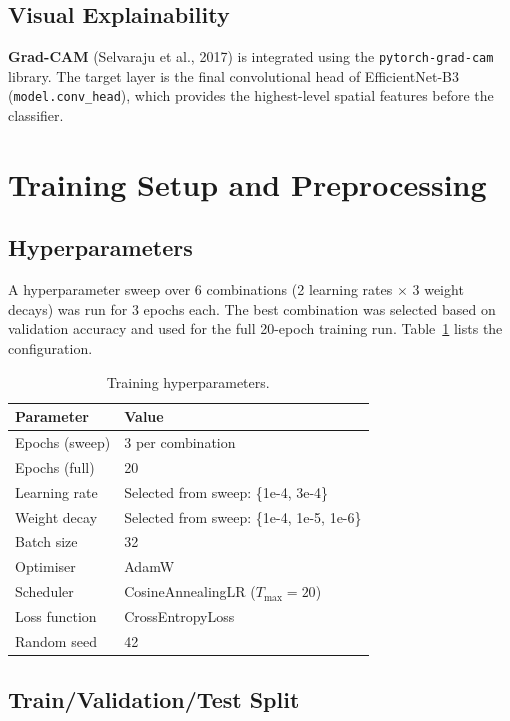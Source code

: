 \documentclass[12pt,a4paper]{article}
\begin{document}
\subsection{Visual Explainability}

\textbf{Grad-CAM} (Selvaraju et al., 2017) is integrated using the \texttt{pytorch-grad-cam} library. The target layer is the final convolutional head of EfficientNet-B3 (\texttt{model.conv\_head}), which provides the highest-level spatial features before the classifier.

\section{Training Setup and Preprocessing}

\subsection{Hyperparameters}

A hyperparameter sweep over 6 combinations (2 learning rates $\times$ 3 weight decays) was run for 3 epochs each. The best combination was selected based on validation accuracy and used for the full 20-epoch training run. Table~\ref{tab:hyperparams} lists the configuration.

\begin{table}[H]
\centering
\caption{Training hyperparameters.}
\label{tab:hyperparams}
\begin{tabular}{ll}
\toprule
\textbf{Parameter} & \textbf{Value} \\
\midrule
Epochs (sweep)      & 3 per combination \\
Epochs (full)       & 20 \\
Learning rate       & Selected from sweep: \{1e-4, 3e-4\} \\
Weight decay        & Selected from sweep: \{1e-4, 1e-5, 1e-6\} \\
Batch size          & 32 \\
Optimiser           & AdamW \\
Scheduler           & CosineAnnealingLR ($T_{\max} = 20$) \\
Loss function       & CrossEntropyLoss \\
Random seed         & 42 \\
\bottomrule
\end{tabular}
\end{table}

\subsection{Train/Validation/Test Split}
\end{document}
